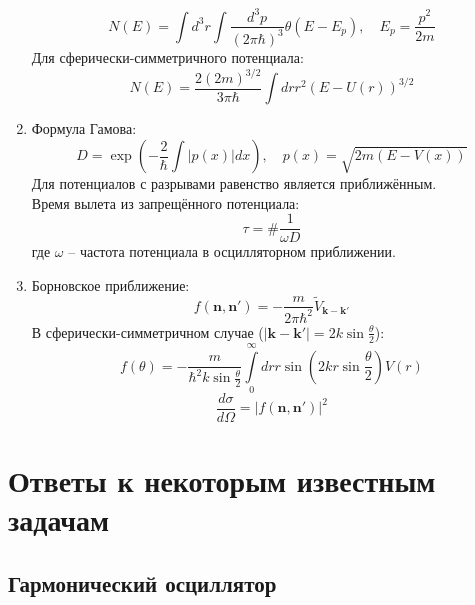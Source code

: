 \documentclass[12pt]{article}
\theoremstyle{definition}
\begin{document}
\begin{enumerate}
\begin{equation}
        N(E)=\int d^3r\int\frac{d^3p}{(2\pi\hbar)^3}\theta(E-E_p),\quad E_p=\frac{p^2}{2m}
    \end{equation}
    Для сферически-симметричного потенциала:
    \begin{equation}
        N(E)=\frac{2(2m)^{3/2}}{3\pi\hbar}\int drr^2(E-U(r))^{3/2}
    \end{equation}
    \item Формула Гамова:
    \begin{equation}
        D=\exp\left(-\frac{2}{\hbar}\int|p(x)|dx\right),\quad p(x)=\sqrt{2m(E-V(x))}
    \end{equation}
    Для потенциалов с разрывами равенство является приближённым.\\
    Время вылета из запрещённого потенциала:
    \begin{equation}
        \tau=\#\frac{1}{\omega D}
    \end{equation}
    где $\omega$ -- частота потенциала в осцилляторном приближении.
    \item Борновское приближение:
    \begin{equation}
        f(\textbf{n},\textbf{n}')=-\frac{m}{2\pi\hbar^2}\tilde V_{\textbf{k}-\textbf{k}'}
    \end{equation}
    В сферически-симметричном случае ($|\textbf{k}-\textbf{k}'|=2k\sin\frac{\theta}{2}$):
    \begin{equation}
        f(\theta)=-\frac{m}{\hbar^2k\sin\frac{\theta}{2}}\int\limits_0^\infty drr\sin\left(2kr\sin\frac{\theta}{2}\right)V(r)
    \end{equation}
    \begin{equation}
        \frac{d\sigma}{d\Omega}=|f(\textbf{n},\textbf{n}')|^2
    \end{equation}
\end{enumerate}
\section{Ответы к некоторым известным задачам}
\subsection{Гармонический осциллятор}
\end{document}
